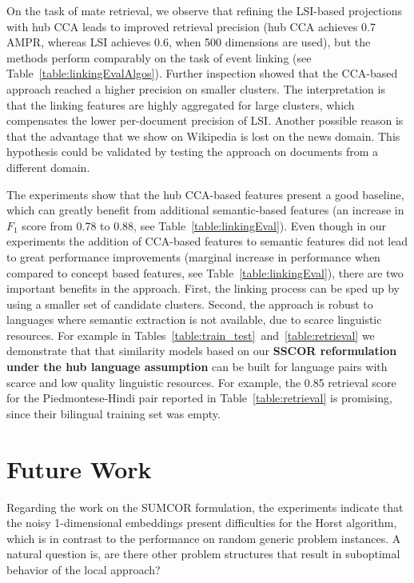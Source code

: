 On the task of mate retrieval, we observe that refining the LSI-based
projections with hub CCA leads to improved retrieval precision (hub CCA
achieves 0.7 AMPR, whereas LSI achieves 0.6, when 500 dimensions are used), but the
methods perform comparably on the task of event linking (see Table~\ref{table:linkingEvalAlgos}). 
Further inspection showed that the CCA-based approach reached a higher precision on smaller
clusters. The interpretation is that the linking features are highly
aggregated for large clusters, which compensates the lower per-document
precision of LSI. Another possible reason is that the advantage that we
show on Wikipedia is lost on the news domain. This hypothesis could be
validated by testing the approach on documents from a different domain.

The experiments show that the hub CCA-based features present a good baseline,
which can greatly benefit from additional semantic-based features (an increase
in $F_1$ score from 0.78 to 0.88, see Table~\ref{table:linkingEval}).
Even though in our experiments the addition of CCA-based features to semantic features did not
lead to great performance improvements (marginal increase in performance when compared
to concept based features, see Table~\ref{table:linkingEval}), there are two important benefits in the
approach. First, the linking process can be sped up by using a smaller set of
candidate clusters. Second, the approach is robust to languages where semantic
extraction is not available, due to scarce linguistic resources.
For example in Tables~\ref{table:train_test}~and~\ref{table:retrieval} we demonstrate
that that similarity models based on our \textbf{SSCOR reformulation under the hub language
assumption} can be built for language pairs with scarce and
low quality linguistic resources. For example, the 0.85 retrieval score
for the Piedmontese-Hindi pair reported in Table~\ref{table:retrieval} is
promising, since their bilingual training set was empty.

\section{Future Work}

Regarding the work on the SUMCOR formulation, the experiments indicate
that the noisy 1-dimensional embeddings present difficulties for the Horst
algorithm, which is in contrast to the performance on random generic problem instances. A natural
question is, are there other problem structures that result in suboptimal behavior of the local approach?

